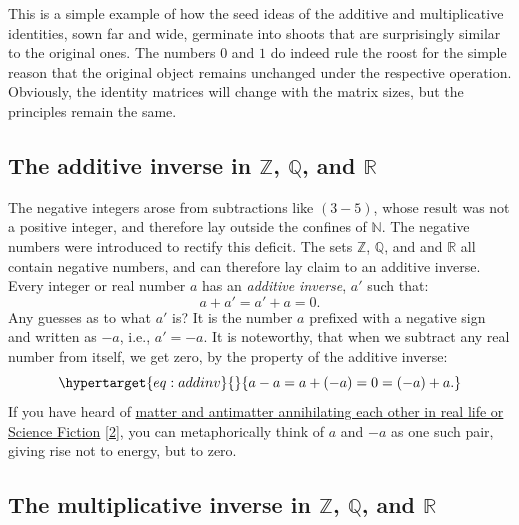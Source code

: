 \documentclass[
  a4paper,
]{article}
\begin{document}
This is a simple example of how the seed ideas of the additive and
multiplicative identities, sown far and wide, germinate into shoots that
are surprisingly similar to the original ones. The numbers \(0\) and
\(1\) do indeed rule the roost for the simple reason that the original
object remains unchanged under the respective operation. Obviously, the
identity matrices will change with the matrix sizes, but the principles
remain the same.

\hypertarget{the-additive-inverse-in-mathbbz-mathbbq-and-mathbbr}{%
\subsection{\texorpdfstring{The additive inverse in \(\mathbb{Z}\),
\(\mathbb{Q}\), and
\(\mathbb{R}\)}{The additive inverse in \textbackslash mathbb\{Z\}, \textbackslash mathbb\{Q\}, and \textbackslash mathbb\{R\}}}\label{the-additive-inverse-in-mathbbz-mathbbq-and-mathbbr}}

The negative integers arose from subtractions like \((3 - 5)\), whose
result was not a positive integer, and therefore lay outside the
confines of \(\mathbb{N}\). The negative numbers were introduced to
rectify this deficit. The sets \(\mathbb{Z}\), \(\mathbb{Q}\), and and
\(\mathbb{R}\) all contain negative numbers, and can therefore lay claim
to an additive inverse. Every integer or real number \(a\) has an
\emph{additive inverse}, \(a'\) such that: \[
a + a' = a' + a = 0.
\] Any guesses as to what \(a'\) is? It is the number \(a\) prefixed
with a negative sign and written as \(-a\), i.e., \(a' = -a\). It is
noteworthy, that when we subtract any real number from itself, we get
zero, by the property of the additive inverse:
\begin{equation}\protect\hypertarget{eq:addinv}{}{
a - a = a + (-a) = 0 = (-a) + a.
}\label{eq:addinv}\end{equation} If you have heard of
\href{https://www.symmetrymagazine.org/article/september-2008/antimatters-science-fiction-debut?language_content_entity=und}{matter
and antimatter annihilating each other in real life or Science Fiction}
{[}\protect\hyperlink{ref-antimatter2008}{2}{]}, you can metaphorically
think of \(a\) and \(-a\) as one such pair, giving rise not to energy,
but to zero. \normalfont

\hypertarget{the-multiplicative-inverse-in-mathbbz-mathbbq-and-mathbbr}{%
\subsection{\texorpdfstring{The multiplicative inverse in
\(\mathbb{Z}\), \(\mathbb{Q}\), and
\(\mathbb{R}\)}{The multiplicative inverse in \textbackslash mathbb\{Z\}, \textbackslash mathbb\{Q\}, and \textbackslash mathbb\{R\}}}\label{the-multiplicative-inverse-in-mathbbz-mathbbq-and-mathbbr}}
\end{document}
